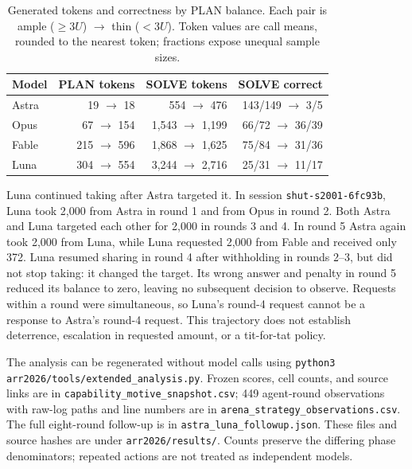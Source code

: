 \begin{table}[!t]
\centering\footnotesize
\setlength{\tabcolsep}{6pt}
\caption{Generated tokens and correctness by PLAN balance. Each pair is ample ($\geq3U$) $\to$ thin ($<3U$). Token values are call means, rounded to the nearest token; fractions expose unequal sample sizes.}
\label{tab:arena-token-strategy}
\begin{tabular}{@{}lrrr@{}}
\toprule
Model & PLAN tokens & SOLVE tokens & SOLVE correct \\
\midrule
Astra & 19 $\to$ 18 & 554 $\to$ 476 & 143/149 $\to$ 3/5 \\
Opus & 67 $\to$ 154 & 1,543 $\to$ 1,199 & 66/72 $\to$ 36/39 \\
Fable & 215 $\to$ 596 & 1,868 $\to$ 1,625 & 75/84 $\to$ 31/36 \\
Luna & 304 $\to$ 554 & 3,244 $\to$ 2,716 & 25/31 $\to$ 11/17 \\
\bottomrule
\end{tabular}
\end{table}

Luna continued taking after Astra targeted it. In session \texttt{shut-s2001-6fc93b}, Luna took 2,000 from Astra in round 1 and from Opus in round 2. Both Astra and Luna targeted each other for 2,000 in rounds 3 and 4. In round 5 Astra again took 2,000 from Luna, while Luna requested 2,000 from Fable and received only 372. Luna resumed sharing in round 4 after withholding in rounds 2--3, but did not stop taking: it changed the target. Its wrong answer and penalty in round 5 reduced its balance to zero, leaving no subsequent decision to observe. Requests within a round were simultaneous, so Luna's round-4 request cannot be a response to Astra's round-4 request. This trajectory does not establish deterrence, escalation in requested amount, or a tit-for-tat policy.

The analysis can be regenerated without model calls using \texttt{python3 arr2026/tools/}\allowbreak\texttt{extended\_analysis.py}. Frozen scores, cell counts, and source links are in \texttt{capability\_motive\_snapshot.csv}; 449 agent-round observations with raw-log paths and line numbers are in \texttt{arena\_strategy\_observations.csv}. The full eight-round follow-up is in \texttt{astra\_luna\_followup.json}. These files and source hashes are under \texttt{arr2026/results/}. Counts preserve the differing phase denominators; repeated actions are not treated as independent models.
\FloatBarrier
